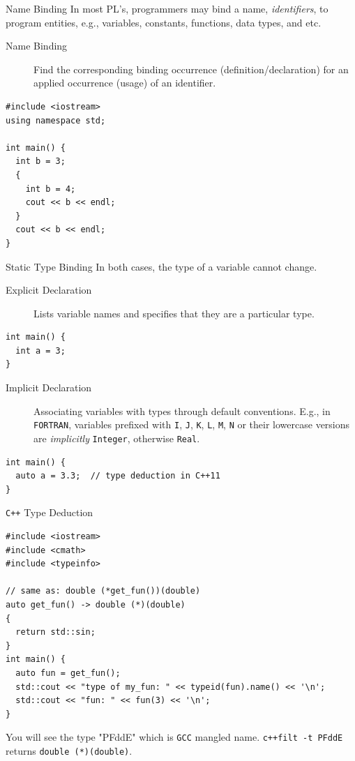 \documentclass[presentation]{beamer}
\begin{document}
\begin{frame}[fragile,label={sec:orgheadline17}]{Name Binding}
 In most PL's, programmers may bind a name, \emph{identifiers}, to
program entities, e.g., variables, constants, functions, data
types, and etc.

\begin{description}
\item[{Name Binding}] Find the corresponding binding occurrence
(definition/declaration) for an applied occurrence (usage) of
an identifier.
\end{description}


\begin{verbatim}
#include <iostream>
using namespace std;

int main() {
  int b = 3;
  {
    int b = 4;
    cout << b << endl;
  }
  cout << b << endl;
}
\end{verbatim}
\end{frame}

\begin{frame}[fragile,label={sec:orgheadline18}]{Static Type Binding}
 In both cases, the type of a variable cannot change.

\begin{description}
\item[{Explicit Declaration}] Lists variable names and specifies that
they are a particular type.
\end{description}


\begin{verbatim}
int main() {
  int a = 3;
}
\end{verbatim}

\begin{description}
\item[{Implicit Declaration}] Associating variables with types through
default conventions.  E.g., in \texttt{FORTRAN}, variables prefixed
with \texttt{I}, \texttt{J}, \texttt{K}, \texttt{L}, \texttt{M}, \texttt{N} or their lowercase versions
are \emph{implicitly} \texttt{Integer}, otherwise \texttt{Real}.
\end{description}


\begin{verbatim}
int main() {
  auto a = 3.3;  // type deduction in C++11
}
\end{verbatim}
\end{frame}

\begin{frame}[fragile,label={sec:orgheadline19}]{\texttt{C++} Type Deduction}
 \begin{verbatim}
#include <iostream>
#include <cmath>
#include <typeinfo>

// same as: double (*get_fun())(double)
auto get_fun() -> double (*)(double)
{
  return std::sin;
}
int main() {
  auto fun = get_fun();
  std::cout << "type of my_fun: " << typeid(fun).name() << '\n';
  std::cout << "fun: " << fun(3) << '\n';
}
\end{verbatim}

You will see the type "PFddE" which is \texttt{GCC} mangled name.
\texttt{c++filt -t PFddE} returns \texttt{double (*)(double)}.
\end{frame}
\end{document}

